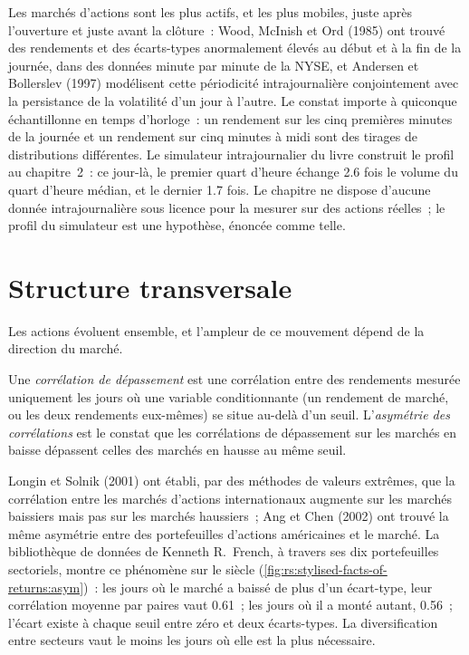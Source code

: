 Les marchés d'actions sont les plus actifs, et les plus mobiles, juste après l'ouverture et juste avant la clôture~: Wood, McInish et Ord (1985) ont trouvé
des rendements et des écarts-types anormalement élevés au début et à la fin de la journée, dans des données minute par minute de la NYSE, et Andersen et
Bollerslev (1997) modélisent cette périodicité intrajournalière conjointement avec la persistance de la volatilité d'un jour à l'autre. Le constat importe à quiconque échantillonne en temps d'horloge~: un rendement sur les cinq premières minutes de la journée et un rendement sur
cinq minutes à midi sont des tirages de distributions différentes. Le simulateur intrajournalier du livre construit le profil au chapitre~2~: ce jour-là,
le premier quart d'heure échange 2.6 fois le volume du quart d'heure médian, et le dernier 1.7 fois. Le chapitre ne dispose d'aucune donnée intrajournalière sous licence
pour la mesurer sur des actions réelles~; le profil du simulateur est une hypothèse, énoncée comme telle.

\section{Structure transversale}

Les actions évoluent ensemble, et l'ampleur de ce mouvement dépend de la direction du marché.

\begin{definition}\label{def:rs:stylised-facts-of-returns:exceedance}
Une \emph{corrélation de dépassement} est une corrélation entre des rendements mesurée uniquement les jours où une
variable conditionnante (un rendement de marché, ou les deux rendements eux-mêmes) se situe au-delà d'un seuil. L'\emph{asymétrie des
corrélations} est le constat que les corrélations de dépassement sur les marchés en baisse dépassent celles des marchés en hausse
au même seuil.
\end{definition}

Longin et Solnik (2001) ont établi, par des méthodes de valeurs extrêmes, que la corrélation entre les marchés d'actions internationaux augmente sur les marchés
baissiers mais pas sur les marchés haussiers~; Ang et Chen (2002) ont trouvé la même asymétrie entre des portefeuilles d'actions américaines et le marché. La
bibliothèque de données de Kenneth R.~French, à travers ses dix portefeuilles sectoriels, montre ce phénomène sur le siècle (\cref{fig:rs:stylised-facts-of-returns:asym})~: les jours où
le marché a baissé de plus d'un écart-type, leur corrélation moyenne par paires vaut 0.61~; les jours où il a monté autant, 0.56~; l'écart
existe à chaque seuil entre zéro et deux écarts-types. La diversification entre secteurs vaut le moins les jours où
elle est la plus nécessaire.

